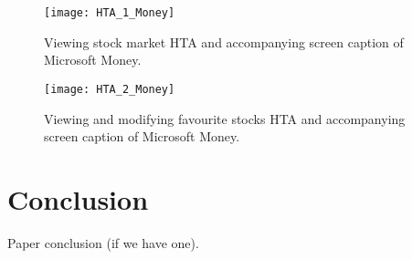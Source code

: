 \documentclass{sigchi}
\begin{document}
\begin{figure*}
	\texttt{[image: HTA\_1\_Money]}
	\caption{Viewing stock market HTA and accompanying screen caption of Microsoft Money.}
	\label{fig:figure1}
\end{figure*}

\begin{figure*}
	\texttt{[image: HTA\_2\_Money]}
	\caption{Viewing and modifying favourite stocks HTA and accompanying screen caption of Microsoft Money.}
	\label{fig:figure2}
\end{figure*}
 


\section{Conclusion}
Paper conclusion (if we have one).




%
%
%
%
%
\balance



\end{document}
